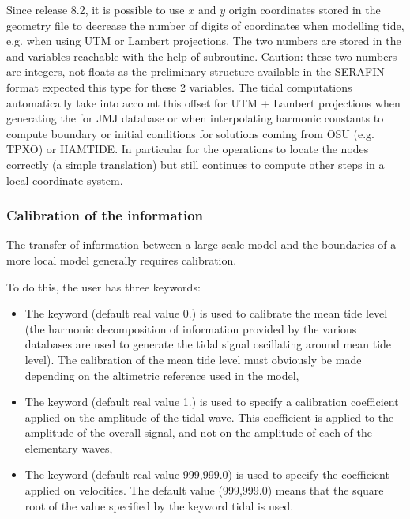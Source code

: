 Since release 8.2, it is possible to use $x$ and $y$ origin coordinates stored
in the geometry file to decrease the number of digits of coordinates
when modelling tide, e.g. when using UTM or Lambert projections.
The two numbers are stored in the  and 
variables reachable with the help of  subroutine.
Caution: these two numbers are integers, not floats as the preliminary structure
available in the SERAFIN format expected this type for these 2 variables.
The tidal computations automatically take into account this offset for
UTM + Lambert projections when generating the 
for JMJ database or when interpolating harmonic constants to compute boundary
or initial conditions for solutions coming from OSU (e.g. TPXO) or HAMTIDE.
In particular for the operations to locate the nodes correctly (a simple
translation) but  still continues to compute other steps in a local
coordinate system.

\subsubsection{Calibration of the information}

The transfer of information between a large scale model and the boundaries of
a more local model generally requires calibration.

To do this, the user has three keywords:

\begin{itemize}
\item The keyword  (default real
value 0.) is used to calibrate the mean tide level (the harmonic decomposition
of information provided by the various databases are used to generate the tidal
signal oscillating around mean tide level). The calibration of the mean tide
level must obviously be made depending on the altimetric reference used in the
model,

\item The keyword  (default real
value 1.) is used to specify a calibration coefficient applied on the
amplitude of the tidal wave. This coefficient is applied to the amplitude of
the overall signal, and not on the amplitude of each of the elementary waves,

\item The keyword  (default
real value 999,999.0) is used to specify the coefficient applied on velocities.
The default value (999,999.0) means that the square root of the value
specified by the keyword  tidal is
used.
\end{itemize}

